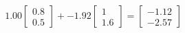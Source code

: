 \documentclass[preview]{standalone}
\begin{document}
\begin{align*}
1.00 \begin{bmatrix} 0.8 \\ 0.5 \end{bmatrix} + -1.92 \begin{bmatrix} 1 \\ 1.6 \end{bmatrix} = \begin{bmatrix} -1.12 \\ -2.57 \end{bmatrix}
\end{align*}
\end{document}
